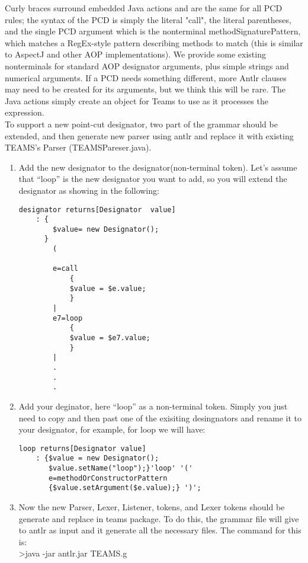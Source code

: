 \documentclass{report}
\begin{document}
Curly braces surround embedded Java actions and are the same for all PCD rules; the syntax of the PCD is simply the literal "call", the literal parentheses, and the single PCD argument which is the nonterminal methodSignaturePattern, which matches a RegEx-style pattern describing methods to match (this is similar to AspectJ and other AOP implementations). We provide some existing nonterminals for standard AOP designator arguments, plus simple strings and numerical arguments. If a PCD needs something different, more Antlr clauses may need to be created for its arguments, but we think this will be rare. The Java actions simply create an object for Teams to use as it processes the expression.\\
To support a new point-cut designator, two part of the grammar should be extended, and then generate new parser using antlr and replace it with existing TEAMS's Parser (TEAMSPareser.java).
\begin{enumerate}
\item Add the new designator to the designator(non-terminal token). Let's assume that ``loop'' is the new designator you want to add, so you will extend the designator as showing in the following: 
\begin{verbatim}
designator returns[Designator  value]
    : {
        $value= new Designator();
      }
        (
        
        e=call
            {
            $value = $e.value;
            } 
        |
        e7=loop
            {
            $value = $e7.value;
            } 
        |
        .
        .
        .
\end{verbatim}
\item Add your deginator, here ``loop'' as a non-terminal token. Simply you just need to copy and then past one of the exisiting desingnators and rename it to your designator, for example, for loop we will have:
\begin{verbatim}
loop returns[Designator value]
	: {$value = new Designator(); 
	   $value.setName("loop");}'loop' '(' 
	   e=methodOrConstructorPattern
	   {$value.setArgument($e.value);} ')';
\end{verbatim}
\item Now the new Parser, Lexer, Listener, tokens, and Lexer tokens should be generate and replace in teams package. 
To do this, the grammar file will give to antlr as input and it generate all the necessary files. The command for this is:\\
\textgreater java -jar antlr.jar  TEAMS.g

\end{enumerate}
\end{document}
